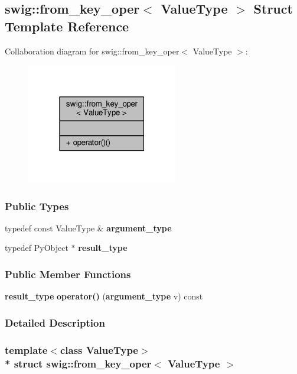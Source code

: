 \subsection{swig\+:\+:from\+\_\+key\+\_\+oper$<$ Value\+Type $>$ Struct Template Reference}
\label{structswig_1_1from__key__oper}


Collaboration diagram for swig\+:\+:from\+\_\+key\+\_\+oper$<$ Value\+Type $>$\+:
\nopagebreak
\begin{figure}[H]
\begin{center}
\leavevmode
\includegraphics[width=187pt]{d8/d3e/structswig_1_1from__key__oper__coll__graph}
\end{center}
\end{figure}
\subsubsection*{Public Types}
\begin{DoxyCompactItemize}
\item 
typedef const Value\+Type \& {\bf argument\+\_\+type}
\item 
typedef Py\+Object $\ast$ {\bf result\+\_\+type}
\end{DoxyCompactItemize}
\subsubsection*{Public Member Functions}
\begin{DoxyCompactItemize}
\item 
{\bf result\+\_\+type} {\bf operator()} ({\bf argument\+\_\+type} v) const 
\end{DoxyCompactItemize}


\subsubsection{Detailed Description}
\subsubsection*{template$<$class Value\+Type$>$\\*
struct swig\+::from\+\_\+key\+\_\+oper$<$ Value\+Type $>$}



